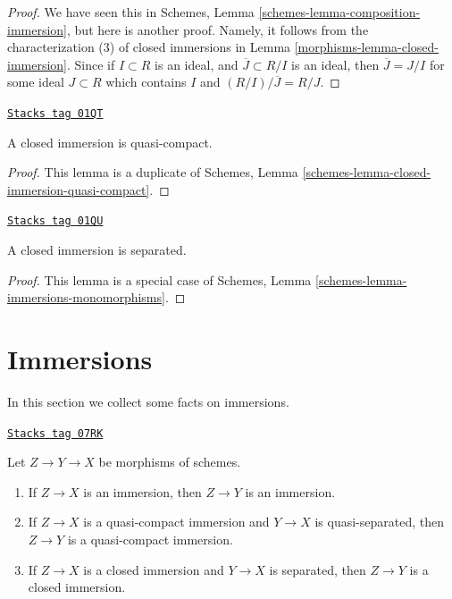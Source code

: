 \begin{proof}

We have seen this in
Schemes, Lemma \ref{schemes-lemma-composition-immersion},
but here is another
proof. Namely, it follows from the characterization (3) of closed immersions
in Lemma \ref{morphisms-lemma-closed-immersion}. Since if $I \subset R$
is an ideal, and $\overline{J} \subset R/I$ is an ideal, then
$\overline{J} = J/I$ for some ideal $J \subset R$ which contains
$I$ and $(R/I)/\overline{J} = R/J$.
\end{proof}

\begin{lemma}
\label{morphisms-lemma-closed-immersion-quasi-compact}
\href{https://stacks.math.columbia.edu/tag/01QT}{\texttt{Stacks tag 01QT}}

A closed immersion is quasi-compact.
\end{lemma}

\begin{proof}
This lemma is a duplicate of
Schemes, Lemma \ref{schemes-lemma-closed-immersion-quasi-compact}.
\end{proof}

\begin{lemma}
\label{morphisms-lemma-closed-immersion-separated}
\href{https://stacks.math.columbia.edu/tag/01QU}{\texttt{Stacks tag 01QU}}

A closed immersion is separated.
\end{lemma}

\begin{proof}
This lemma is a special case of
Schemes, Lemma \ref{schemes-lemma-immersions-monomorphisms}.
\end{proof}

\section{Immersions}
\label{morphisms-section-immersions}
In this section we collect some facts on immersions.

\begin{lemma}
\label{morphisms-lemma-immersion-permanence}
\href{https://stacks.math.columbia.edu/tag/07RK}{\texttt{Stacks tag 07RK}}

Let $Z \to Y \to X$ be morphisms of schemes.
\begin{enumerate}
\item If $Z \to X$ is an immersion, then $Z \to Y$ is an immersion.
\item If $Z \to X$ is a quasi-compact immersion and $Y \to X$ is
quasi-separated, then $Z \to Y$ is a quasi-compact immersion.
\item If $Z \to X$ is a closed immersion and $Y \to X$ is separated,
then $Z \to Y$ is a closed immersion.
\end{enumerate}
\end{lemma}

